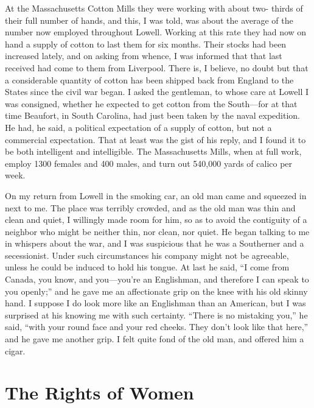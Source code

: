 At the Massachusetts Cotton Mills they were working with about two-
thirds of their full number of hands, and this, I was told, was
about the average of the number now employed throughout Lowell.
Working at this rate they had now on hand a supply of cotton to
last them for six months.  Their stocks had been increased lately,
and on asking from whence, I was informed that that last received
had come to them from Liverpool.  There is, I believe, no doubt but
that a considerable quantity of cotton has been shipped back from
England to the States since the civil war began.  I asked the
gentleman, to whose care at Lowell I was consigned, whether he
expected to get cotton from the South---for at that time Beaufort,
in South Carolina, had just been taken by the naval expedition.  He
had, he said, a political expectation of a supply of cotton, but
not a commercial expectation.  That at least was the gist of his
reply, and I found it to be both intelligent and intelligible.  The
Massachusetts Mills, when at full work, employ 1300 females and 400
males, and turn out 540,000 yards of calico per week.

On my return from Lowell in the smoking car, an old man came and
squeezed in next to me.  The place was terribly crowded, and as the
old man was thin and clean and quiet, I willingly made room for
him, so as to avoid the contiguity of a neighbor who might be
neither thin, nor clean, nor quiet.  He began talking to me in
whispers about the war, and I was suspicious that he was a
Southerner and a secessionist.  Under such circumstances his
company might not be agreeable, unless he could be induced to hold
his tongue.  At last he said, ``I come from Canada, you know, and
you---you're an Englishman, and therefore I can speak to you
openly;'' and he gave me an affectionate grip on the knee with his
old skinny hand.  I suppose I do look more like an Englishman than
an American, but I was surprised at his knowing me with such
certainty.  ``There is no mistaking you,'' he said, ``with your round
face and your red cheeks.  They don't look like that here,'' and he
gave me another grip.  I felt quite fond of the old man, and
offered him a cigar.



\chapter{The Rights of Women}



